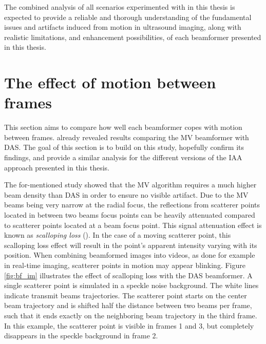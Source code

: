 The combined analysis of all scenarios experimented with in this thesis is expected to provide a reliable and thorough understanding of the fundamental issues and artifacts induced from motion in ultrasound imaging, along with realistic limitations, and enhancement possibilities, of each beamformer presented in this thesis.

\section{The effect of motion between frames}
\label{sec:frames_motion}
This section aims to compare how well each beamformer copes with motion between frames. \cite{Asen_shift_invariance} already revealed results comparing the MV beamformer with DAS. The goal of this section is to build on this study, hopefully confirm its findings, and provide a similar analysis for the different versions of the IAA approach presented in this thesis.

The for-mentioned study showed that the MV algorithm requires a much higher beam density than DAS in order to ensure no visible artifact. Due to the MV beams being very narrow at the radial focus, the reflections from scatterer points located in between two beams focus points can be heavily attenuated compared to scatterer points located at a beam focus point. This signal attenuation effect is known as \textit{scalloping loss} (\cite{Asen_shift_invariance}). In the case of a moving scatterer point, this scalloping loss effect will result in the point's apparent intensity varying with its position. When combining beamformed images into videos, as done for example in real-time imaging,  scatterer points in motion may appear blinking. Figure \ref{fig:bf_im} illustrates the effect of scalloping loss with the DAS beamformer. A single scatterer point is simulated in a speckle noise background. The white lines indicate transmit beams trajectories. The scatterer point starts on the center beam trajectory and is shifted half the distance between two beams per frame, such that it ends exactly on the neighboring beam trajectory in the third frame. In this example, the scatterer point is visible in frames 1 and 3, but completely disappears in the speckle background in frame 2.

